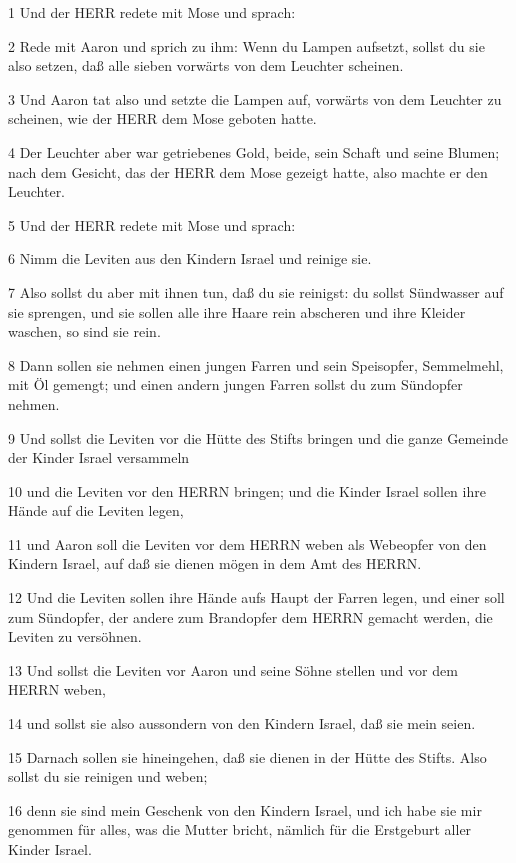 \par 1 Und der HERR redete mit Mose und sprach:
\par 2 Rede mit Aaron und sprich zu ihm: Wenn du Lampen aufsetzt, sollst du sie also setzen, daß alle sieben vorwärts von dem Leuchter scheinen.
\par 3 Und Aaron tat also und setzte die Lampen auf, vorwärts von dem Leuchter zu scheinen, wie der HERR dem Mose geboten hatte.
\par 4 Der Leuchter aber war getriebenes Gold, beide, sein Schaft und seine Blumen; nach dem Gesicht, das der HERR dem Mose gezeigt hatte, also machte er den Leuchter.
\par 5 Und der HERR redete mit Mose und sprach:
\par 6 Nimm die Leviten aus den Kindern Israel und reinige sie.
\par 7 Also sollst du aber mit ihnen tun, daß du sie reinigst: du sollst Sündwasser auf sie sprengen, und sie sollen alle ihre Haare rein abscheren und ihre Kleider waschen, so sind sie rein.
\par 8 Dann sollen sie nehmen einen jungen Farren und sein Speisopfer, Semmelmehl, mit Öl gemengt; und einen andern jungen Farren sollst du zum Sündopfer nehmen.
\par 9 Und sollst die Leviten vor die Hütte des Stifts bringen und die ganze Gemeinde der Kinder Israel versammeln
\par 10 und die Leviten vor den HERRN bringen; und die Kinder Israel sollen ihre Hände auf die Leviten legen,
\par 11 und Aaron soll die Leviten vor dem HERRN weben als Webeopfer von den Kindern Israel, auf daß sie dienen mögen in dem Amt des HERRN.
\par 12 Und die Leviten sollen ihre Hände aufs Haupt der Farren legen, und einer soll zum Sündopfer, der andere zum Brandopfer dem HERRN gemacht werden, die Leviten zu versöhnen.
\par 13 Und sollst die Leviten vor Aaron und seine Söhne stellen und vor dem HERRN weben,
\par 14 und sollst sie also aussondern von den Kindern Israel, daß sie mein seien.
\par 15 Darnach sollen sie hineingehen, daß sie dienen in der Hütte des Stifts. Also sollst du sie reinigen und weben;
\par 16 denn sie sind mein Geschenk von den Kindern Israel, und ich habe sie mir genommen für alles, was die Mutter bricht, nämlich für die Erstgeburt aller Kinder Israel.
